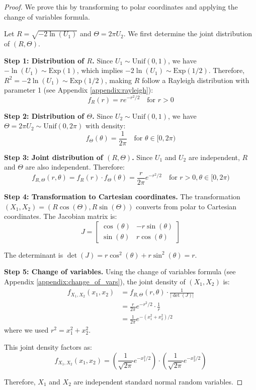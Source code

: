 \begin{proof}
We prove this by transforming to polar coordinates and applying the change of variables formula.

Let $R = \sqrt{-2\ln(U_1)}$ and $\Theta = 2\pi U_2$. We first determine the joint distribution of $(R, \Theta)$.

\textbf{Step 1: Distribution of $R$.}
Since $U_1 \sim \text{Unif}(0,1)$, we have $-\ln(U_1) \sim \text{Exp}(1)$, which implies $-2\ln(U_1) \sim \text{Exp}(1/2)$. Therefore, $R^2 = -2\ln(U_1) \sim \text{Exp}(1/2)$, making $R$ follow a Rayleigh distribution with parameter 1 (see Appendix \ref{appendix:rayleigh}):
$$f_R(r) = re^{-r^2/2} \quad \text{for } r > 0$$

\textbf{Step 2: Distribution of $\Theta$.}
Since $U_2 \sim \text{Unif}(0,1)$, we have $\Theta = 2\pi U_2 \sim \text{Unif}(0, 2\pi)$ with density:
$$f_\Theta(\theta) = \frac{1}{2\pi} \quad \text{for } \theta \in [0, 2\pi)$$

\textbf{Step 3: Joint distribution of $(R, \Theta)$.}
Since $U_1$ and $U_2$ are independent, $R$ and $\Theta$ are also independent. Therefore:
$$f_{R,\Theta}(r, \theta) = f_R(r) \cdot f_\Theta(\theta) = \frac{r}{2\pi} e^{-r^2/2} \quad \text{for } r > 0, \theta \in [0, 2\pi)$$

\textbf{Step 4: Transformation to Cartesian coordinates.}
The transformation $(X_1, X_2) = (R\cos(\Theta), R\sin(\Theta))$ converts from polar to Cartesian coordinates. The Jacobian matrix is:
$$J = \begin{bmatrix}
\cos(\theta) & -r\sin(\theta) \\
\sin(\theta) & r\cos(\theta)
\end{bmatrix}$$

The determinant is $\det(J) = r\cos^2(\theta) + r\sin^2(\theta) = r$.

\textbf{Step 5: Change of variables.}
Using the change of variables formula (see Appendix \ref{appendix:change_of_vars}), the joint density of $(X_1, X_2)$ is:
\begin{align*}
f_{X_1,X_2}(x_1, x_2) &= f_{R,\Theta}(r, \theta) \cdot \frac{1}{|\det(J)|} \\
&= \frac{r}{2\pi} e^{-r^2/2} \cdot \frac{1}{r} \\
&= \frac{1}{2\pi} e^{-(x_1^2 + x_2^2)/2}
\end{align*}
where we used $r^2 = x_1^2 + x_2^2$.

This joint density factors as:
$$f_{X_1,X_2}(x_1, x_2) = \left(\frac{1}{\sqrt{2\pi}} e^{-x_1^2/2}\right) \cdot \left(\frac{1}{\sqrt{2\pi}} e^{-x_2^2/2}\right)$$

Therefore, $X_1$ and $X_2$ are independent standard normal random variables.
\end{proof}

